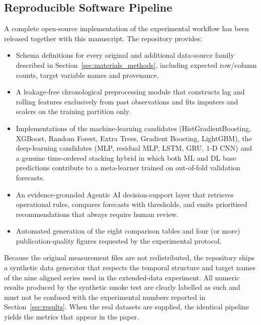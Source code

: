 
\subsection{Reproducible Software Pipeline}
\label{subsec:reproducible_pipeline}

A complete open-source implementation of the experimental workflow has been
released together with this manuscript.  The repository provides:

\begin{itemize}
    \item Schema definitions for every original and additional data-source
    family described in Section~\ref{sec:materials_methods}, including
    expected row/column counts, target variable names and provenance.
    \item A leakage-free chronological preprocessing module that constructs
    lag and rolling features exclusively from past observations and fits
    imputers and scalers on the training partition only.
    \item Implementations of the machine-learning candidates
    (HistGradientBoosting, XGBoost, Random Forest, Extra Trees,
    Gradient Boosting, LightGBM), the deep-learning candidates
    (MLP, residual MLP, LSTM, GRU, 1-D CNN) and a genuine time-ordered
    stacking hybrid in which both ML and DL base predictions contribute
    to a meta-learner trained on out-of-fold validation forecasts.
    \item An evidence-grounded Agentic AI decision-support layer that
    retrieves operational rules, compares forecasts with thresholds, and
    emits prioritised recommendations that always require human review.
    \item Automated generation of the eight comparison tables and four
    (or more) publication-quality figures requested by the experimental
    protocol.
\end{itemize}

Because the original measurement files are not redistributed, the
repository ships a synthetic data generator that respects the temporal
structure and target names of the nine aligned series used in the
extended-data experiment.  All numeric results produced by the
synthetic smoke test are clearly labelled as such and must not be
confused with the experimental numbers reported in
Section~\ref{sec:results}.  When the real datasets are supplied, the
identical pipeline yields the metrics that appear in the paper.

